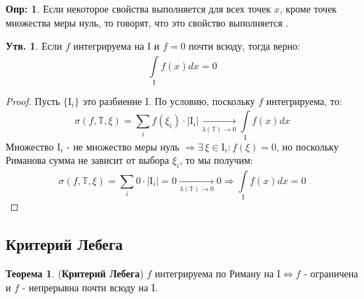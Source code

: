 \documentclass[12pt]{article}
\newcommand{\MTB}{\mathbb{T}}
\newcommand{\MI}{\mathrm{I}}
\theoremstyle{definition}
\newtheorem{defn}{Опр:}
\newtheorem{prop}{Утв.}
\newtheorem{theorem}{Теорема}
\newcommand{\ddsum}[2]{\displaystyle\sum\limits_{#1}^{#2}}
\newcommand{\ddint}[2]{\displaystyle\int\limits_{#1}^{#2}}
\begin{document}
\begin{defn}
	Если некоторое свойства выполняется для всех точек $x$, кроме точек множества меры нуль, то говорят, что это свойство выполняется .
\end{defn}

\begin{prop}
	Если $f$ интегрируема на $\MI$ и $f = 0$ почти всюду, тогда верно:
	$$
		\ddint{\MI}{}f(x)dx = 0
	$$
\end{prop}
\begin{proof}
	Пусть $\{\MI_i\}$ это разбиение $\MI$. По условию, поскольку $f$ интегрируема, то:
	$$
		\sigma(f,\MTB,\xi) = \ddsum{i}{}f(\xi_i){\cdot}|\MI_i| \xrightarrow[\lambda(\MTB) \to 0]{} \ddint{\MI}{}f(x)dx
	$$
	Множество $\MI_i$ - не множество меры нуль $\Rightarrow \exists \, \xi \in \MI_i \colon f(\xi) = 0$, но поскольку Риманова сумма не зависит от выбора $\xi_i$, то мы получим:
	$$
		\sigma(f,\MTB,\xi) = \ddsum{i}{}0{\cdot}|\MI_i| = 0 \xrightarrow[\lambda(\MTB) \to 0]{} 0 \Rightarrow \ddint{\MI}{}f(x)dx = 0
	$$
\end{proof}
\subsection*{Критерий Лебега}
\begin{theorem}(\textbf{Критерий Лебега})
	$f$ интегрируема по Риману на $\MI \Leftrightarrow f$ - ограничена и $f$ - непрерывна почти всюду на $\MI$.
\end{theorem}
\end{document}
